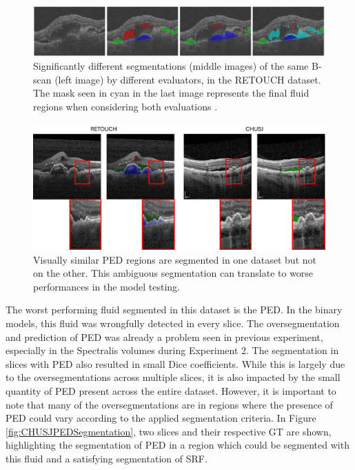\begin{figure}[!ht]
	\centering
	\includegraphics[width=1.0\linewidth]{figures/RETOUCHSegmentationDifferences.png}
	\caption{Significantly different segmentations (middle images) of the same B-scan (left image) by different evaluators, in the RETOUCH dataset. The mask seen in cyan in the last image represents the final fluid regions when considering both evaluations \parencite{Bogunovic2019b}.}
	\label{fig:RETOUCHSegmentationDifferences}
\end{figure}

\begin{figure}[!ht]
	\centering
	\includegraphics[width=1.0\linewidth]{figures/RETOUCHvsCHUSJSegmentationCriteria.png}
	\caption{Visually similar PED regions are segmented in one dataset but not on the other. This ambiguous segmentation can translate to worse performances in the model testing.}
	\label{fig:RETOUCHvsCHUSJSegmentationCriteria}
\end{figure}

The worst performing fluid segmented in this dataset is the PED. In the binary models, this fluid was wrongfully detected in every slice. The oversegmentation and prediction of PED was already a problem seen in previous experiment, especially in the Spectralis volumes during Experiment 2. The segmentation in slices with PED also resulted in small Dice coefficients. While this is largely due to the oversegmentations across multiple slices, it is also impacted by the small quantity of PED present across the entire dataset. However, it is important to note that many of the oversegmentations are in regions where the presence of PED could vary according to the applied segmentation criteria. In Figure \ref{fig:CHUSJPEDSegmentation}, two slices and their respective GT are shown, highlighting the segmentation of PED in a region which could be segmented with this fluid and a satisfying segmentation of SRF.

